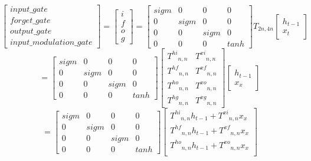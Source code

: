 \documentclass[12pt]{article}
\begin{document}
\begin{enumerate}
\begin{enumerate}
\[
\begin{bmatrix}
    input\_gate \\
    forget\_gate \\
    output\_gate \\
    input\_modulation\_gate
\end{bmatrix}
=
\begin{bmatrix}
    i \\
    f \\
    o \\
    g
\end{bmatrix}
=
\begin{bmatrix}
    sigm & 0 & 0 & 0\\
    0 & sigm & 0 & 0\\
    0 & 0 & sigm & 0\\
    0 & 0 & 0 & tanh
\end{bmatrix}
T_{2n,4n}
\begin{bmatrix}
    h_{t-1} \\
    x_{t}
\end{bmatrix}
\]
\[
=
\begin{bmatrix}
    sigm & 0 & 0 & 0\\
    0 & sigm & 0 & 0\\
    0 & 0 & sigm & 0\\
    0 & 0 & 0 & tanh
\end{bmatrix}
\begin{bmatrix}
    {T^{hi}}_{n,n} & {T^{xi}}_{n,n} \\
    {T^{hf}}_{n,n} & {T^{xf}}_{n,n} \\
    {T^{ho}}_{n,n} & {T^{xo}}_{n,n} \\
    {T^{hg}}_{n,n} & {T^{xg}}_{n,n}
\end{bmatrix}
\begin{bmatrix}
    h_{t-1} \\
    x_{x}
\end{bmatrix}
\]
\[
=
\begin{bmatrix}
    sigm & 0 & 0 & 0\\
    0 & sigm & 0 & 0\\
    0 & 0 & sigm & 0\\
    0 & 0 & 0 & tanh
\end{bmatrix}
\begin{bmatrix}
    {T^{hi}}_{n,n}h_{t-1} + {T^{xi}}_{n,n}x_{x} \\
    {T^{hf}}_{n,n}h_{t-1} + {T^{xf}}_{n,n}x_{x} \\
    {T^{ho}}_{n,n}h_{t-1} + {T^{xo}}_{n,n}x_{x} \\

\end{bmatrix}\]
\end{enumerate}
\end{enumerate}
\end{document}

